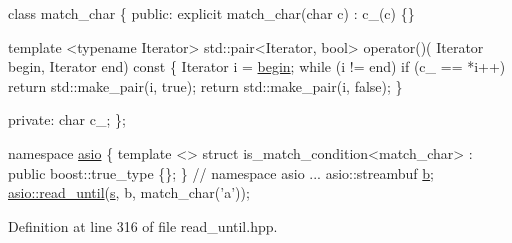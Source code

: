 \begin{DoxyCode}
 \textcolor{keyword}{class }match\_char
\{
\textcolor{keyword}{public}:
  \textcolor{keyword}{explicit} match\_char(\textcolor{keywordtype}{char} c) : c\_(c) \{\}

  \textcolor{keyword}{template} <\textcolor{keyword}{typename} Iterator>
  std::pair<Iterator, bool> operator()(
      Iterator begin, Iterator end)\textcolor{keyword}{ const}
\textcolor{keyword}{  }\{
    Iterator i = \hyperlink{group__async__connect_ga7055bca9225050c030c19c7dc926fa53}{begin};
    \textcolor{keywordflow}{while} (i != end)
      \textcolor{keywordflow}{if} (c\_ == *i++)
        \textcolor{keywordflow}{return} std::make\_pair(i, \textcolor{keyword}{true});
    \textcolor{keywordflow}{return} std::make\_pair(i, \textcolor{keyword}{false});
  \}

\textcolor{keyword}{private}:
  \textcolor{keywordtype}{char} c\_;
\};

\textcolor{keyword}{namespace }\hyperlink{namespaceasio}{asio} \{
  \textcolor{keyword}{template} <> \textcolor{keyword}{struct }is\_match\_condition<match\_char>
    : \textcolor{keyword}{public} boost::true\_type \{\};
\} \textcolor{comment}{// namespace asio}
...
asio::streambuf \hyperlink{group__async__read_ga945a5c18fa77a9e2eba420f8f44b2a4f}{b};
\hyperlink{group__read__until_ga1aae2baa82596a6a9ad320e80b016006}{asio::read\_until}(\hyperlink{group__async__connect_ga31ab74b9ea6c77932dddd016cfc7920a}{s}, b, match\_char(\textcolor{charliteral}{'a'}));
\end{DoxyCode}
 

Definition at line 316 of file read\+\_\+until.\+hpp.

